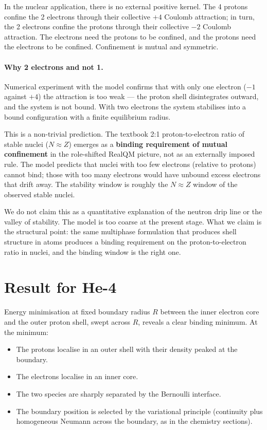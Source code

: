 In the nuclear application, there is no external positive kernel. The 4 protons confine the 2 electrons through their collective $+4$ Coulomb attraction; in turn, the 2 electrons confine the protons through their collective $-2$ Coulomb attraction. The electrons need the protons to be confined, and the protons need the electrons to be confined. Confinement is mutual and symmetric.

\paragraph{Why 2 electrons and not 1.}
Numerical experiment with the model confirms that with only one electron ($-1$ against $+4$) the attraction is too weak --- the proton shell disintegrates outward, and the system is not bound. With two electrons the system stabilises into a bound configuration with a finite equilibrium radius.

This is a non-trivial prediction. The textbook 2:1 proton-to-electron ratio of stable nuclei ($N \approx Z$) emerges as a \textbf{binding requirement of mutual confinement} in the role-shifted RealQM picture, not as an externally imposed rule. The model predicts that nuclei with too few electrons (relative to protons) cannot bind; those with too many electrons would have unbound excess electrons that drift away. The stability window is roughly the $N \approx Z$ window of the observed stable nuclei.

We do not claim this as a quantitative explanation of the neutron drip line or the valley of stability. The model is too coarse at the present stage. What we claim is the structural point: the same multiphase formulation that produces shell structure in atoms produces a binding requirement on the proton-to-electron ratio in nuclei, and the binding window is the right one.

\section{Result for He-4}\label{sec:he4-natural-result}

Energy minimisation at fixed boundary radius $R$ between the inner electron core and the outer proton shell, swept across $R$, reveals a clear binding minimum. At the minimum:

\begin{itemize}
\item The protons localise in an outer shell with their density peaked at the boundary.
\item The electrons localise in an inner core.
\item The two species are sharply separated by the Bernoulli interface.
\item The boundary position is selected by the variational principle (continuity plus homogeneous Neumann across the boundary, as in the chemistry sections).
\end{itemize}

